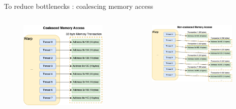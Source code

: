 \documentclass[dvipdfmx, 11pt, aspectratio=169]{beamer}   %
\begin{document}
\begin{frame}{To reduce bottlenecks : coalescing memory access}
  \begin{columns}
    \begin{figure}
      \includegraphics[scale=0.1]{img/coalesced.png}
    \end{figure}
    \begin{figure}
      \includegraphics[scale=0.1]{img/non-coalesced.png}
    \end{figure}
  \end{columns}
\end{frame}
\end{document}
